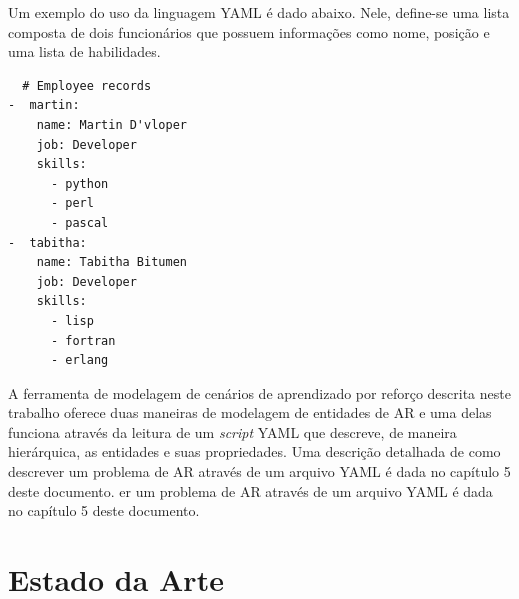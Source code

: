 \documentclass[cic,tc]{iiufrgs}
\begin{document}


Um exemplo do uso da linguagem YAML é dado abaixo. Nele, define-se uma lista composta de dois
funcionários que possuem informações como nome, posição e uma lista de habilidades.

\begin{verbatim}
  # Employee records
-  martin:
    name: Martin D'vloper
    job: Developer
    skills:
      - python
      - perl
      - pascal
-  tabitha:
    name: Tabitha Bitumen
    job: Developer
    skills:
      - lisp
      - fortran
      - erlang
\end{verbatim}


A ferramenta de modelagem de cenários de aprendizado por reforço descrita neste trabalho oferece duas maneiras de modelagem de entidades de AR e uma delas
funciona através da leitura de um \textit{script} YAML que descreve, de maneira hierárquica, as entidades e suas propriedades. Uma descrição detalhada de como
descrever um problema de AR através de um arquivo YAML é dada no capítulo 5 deste documento.
er um problema de AR através de um arquivo YAML é dada no capítulo 5 deste documento.

\chapter{Estado da Arte}
\end{document}
